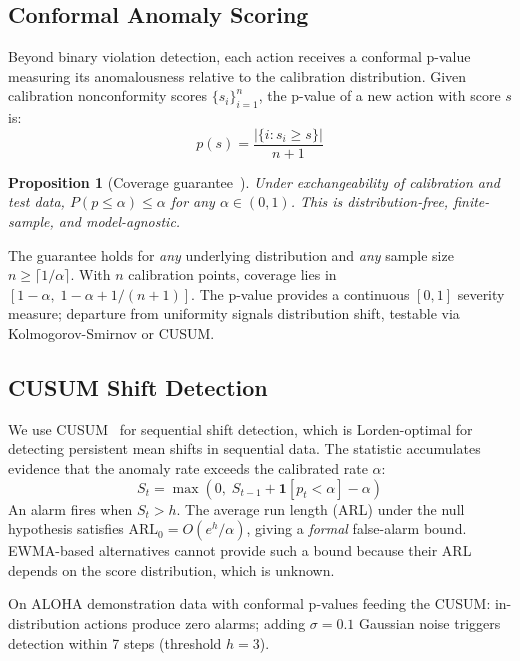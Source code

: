 \documentclass[conference]{IEEEtran}
\newtheorem{proposition}{Proposition}
\begin{document}
\subsection{Conformal Anomaly Scoring}
\label{sec:monitoring}

Beyond binary violation detection, each action receives a conformal p-value measuring its anomalousness relative to the calibration distribution.
Given calibration nonconformity scores $\{s_i\}_{i=1}^n$, the p-value of a new action with score $s$ is:
\begin{equation}
p(s) = \frac{|\{i : s_i \ge s\}|}{n+1}
\end{equation}

\begin{proposition}[Coverage guarantee~\cite{vovk2005}]
Under exchangeability of calibration and test data, $P(p \le \alpha) \le \alpha$ for any $\alpha \in (0,1)$.
This is distribution-free, finite-sample, and model-agnostic.
\end{proposition}

The guarantee holds for \emph{any} underlying distribution and \emph{any} sample size $n \ge \lceil 1/\alpha \rceil$.
With $n$ calibration points, coverage lies in $[1{-}\alpha,\; 1{-}\alpha + 1/(n{+}1)]$.
The p-value provides a continuous $[0,1]$ severity measure; departure from uniformity signals distribution shift, testable via Kolmogorov-Smirnov or CUSUM.

\subsection{CUSUM Shift Detection}
\label{sec:cusum}

We use CUSUM~\cite{page1954} for sequential shift detection, which is Lorden-optimal for detecting persistent mean shifts in sequential data.
The statistic accumulates evidence that the anomaly rate exceeds the calibrated rate $\alpha$:
\begin{equation}
S_t = \max(0,\; S_{t-1} + \mathbf{1}[p_t < \alpha] - \alpha)
\end{equation}
An alarm fires when $S_t > h$.
The average run length (ARL) under the null hypothesis satisfies $\text{ARL}_0 = O(e^h / \alpha)$, giving a \emph{formal} false-alarm bound.
EWMA-based alternatives cannot provide such a bound because their ARL depends on the score distribution, which is unknown.

On ALOHA demonstration data with conformal p-values feeding the CUSUM: in-distribution actions produce zero alarms; adding $\sigma{=}0.1$ Gaussian noise triggers detection within 7 steps (threshold $h{=}3$).
\end{document}
